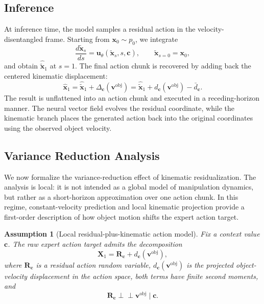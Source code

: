 \documentclass[10pt,twocolumn,letterpaper]{article}
\newtheorem{assumption}{Assumption}
\begin{document}
\subsection{Inference}
\label{subsec:inference}

At inference time, the model samples a residual action in the
velocity-disentangled frame. Starting from $\mathbf x_0\sim p_0$, we integrate
\[
    \frac{d\widetilde{\mathbf x}_s}{ds}
    =
    \mathbf u_\theta(\widetilde{\mathbf x}_s,s,\mathbf c),
    \qquad
    \widetilde{\mathbf x}_{s=0}=\mathbf x_0,
\]
and obtain $\widehat{\widetilde{\mathbf x}}_1$ at $s=1$. The final action chunk
is recovered by adding back the centered kinematic displacement:
\begin{equation}
    \widehat{\mathbf x}_1
    =
    \widehat{\widetilde{\mathbf x}}_1
    +
    \Delta_{\mathbf c}(\mathbf v^\text{obj})
    =
    \widehat{\widetilde{\mathbf x}}_1
    +
    d_{\mathbf c}(\mathbf v^\text{obj})
    -
    \bar d_{\mathbf c}.
    \label{eq:residual_to_raw_inference}
\end{equation}
The result is unflattened into an action chunk and executed in a
receding-horizon manner. The neural vector field evolves the residual
coordinate, while the kinematic branch places the generated action back into
the original coordinates using the observed object velocity.



\subsection{Variance Reduction Analysis}
\label{subsec:variance_reduction}

We now formalize the variance-reduction effect of kinematic residualization.
The analysis is local: it is not intended as a global model of manipulation
dynamics, but rather as a short-horizon approximation over one action chunk. In
this regime, constant-velocity prediction and local kinematic projection provide
a first-order description of how object motion shifts the expert action target.

\begin{assumption}[Local residual-plus-kinematic action model]
\label{ass:local_residual_kinematic_model}
Fix a context value $\mathbf c$. The raw expert action target admits the
decomposition
\begin{equation}
    \mathbf X_1
    =
    \mathbf R_{\mathbf c}
    +
    d_{\mathbf c}(\mathbf v^\text{obj}),
    \label{eq:local_residual_kinematic_model}
\end{equation}
where $\mathbf R_{\mathbf c}$ is a residual action random variable,
$d_{\mathbf c}(\mathbf v^\text{obj})$ is the projected object-velocity displacement in
the action space, both terms have finite second moments, and
\[
    \mathbf R_{\mathbf c}
    \perp\!\!\!\perp
    \mathbf v^\text{obj}
    \mid
    \mathbf c.
\]
\end{assumption}
\end{document}
